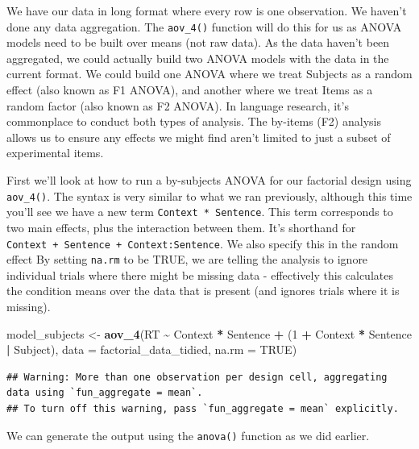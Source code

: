 \documentclass[
]{book}
\newenvironment{Shaded}{\begin{snugshade}}{\end{snugshade}}
\newcommand{\AttributeTok}[1]{\textcolor[rgb]{0.13,0.29,0.53}{#1}}
\newcommand{\ConstantTok}[1]{\textcolor[rgb]{0.56,0.35,0.01}{#1}}
\newcommand{\DecValTok}[1]{\textcolor[rgb]{0.00,0.00,0.81}{#1}}
\newcommand{\FunctionTok}[1]{\textcolor[rgb]{0.13,0.29,0.53}{\textbf{#1}}}
\newcommand{\NormalTok}[1]{#1}
\newcommand{\OtherTok}[1]{\textcolor[rgb]{0.56,0.35,0.01}{#1}}
\newcommand{\SpecialCharTok}[1]{\textcolor[rgb]{0.81,0.36,0.00}{\textbf{#1}}}
\begin{document}
We have our data in long format where every row is one observation. We haven't done any data aggregation. The \texttt{aov\_4()} function will do this for us as ANOVA models need to be built over means (not raw data). As the data haven't been aggregated, we could actually build two ANOVA models with the data in the current format. We could build one ANOVA where we treat Subjects as a random effect (also known as F1 ANOVA), and another where we treat Items as a random factor (also known as F2 ANOVA). In language research, it's commonplace to conduct both types of analysis. The by-items (F2) analysis allows us to ensure any effects we might find aren't limited to just a subset of experimental items.

First we'll look at how to run a by-subjects ANOVA for our factorial design using \texttt{aov\_4()}. The syntax is very similar to what we ran previously, although this time you'll see we have a new term \texttt{Context\ *\ Sentence}. This term corresponds to two main effects, plus the interaction between them. It's shorthand for \texttt{Context\ +\ Sentence\ +\ Context:Sentence}. We also specify this in the random effect By setting \texttt{na.rm} to be TRUE, we are telling the analysis to ignore individual trials where there might be missing data - effectively this calculates the condition means over the data that is present (and ignores trials where it is missing).

\begin{Shaded}
\begin{Highlighting}[]
\NormalTok{model\_subjects }\OtherTok{\textless{}{-}} \FunctionTok{aov\_4}\NormalTok{(RT }\SpecialCharTok{\textasciitilde{}}\NormalTok{ Context }\SpecialCharTok{*}\NormalTok{ Sentence }\SpecialCharTok{+}\NormalTok{ (}\DecValTok{1} \SpecialCharTok{+}\NormalTok{ Context }\SpecialCharTok{*}\NormalTok{ Sentence }\SpecialCharTok{|}\NormalTok{ Subject), }\AttributeTok{data =}\NormalTok{ factorial\_data\_tidied, }\AttributeTok{na.rm =} \ConstantTok{TRUE}\NormalTok{)}
\end{Highlighting}
\end{Shaded}

\begin{verbatim}
## Warning: More than one observation per design cell, aggregating data using `fun_aggregate = mean`.
## To turn off this warning, pass `fun_aggregate = mean` explicitly.
\end{verbatim}

We can generate the output using the \texttt{anova()} function as we did earlier.
\end{document}
